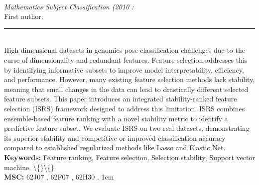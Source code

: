 \documentclass[10pt,twoside]{article}
\begin{document}
\noindent\begin{minipage}[t][\textheight]{\textwidth}
\\[0.35em]
{\itshape Mathematics Subject Classification (2010 :}\\[0.2em]
{\footnotesize First author: }\\[0.45em]
\noindent\rule{\textwidth}{0.3pt}\\[0.4em]
{\footnotesize  High-dimensional datasets in genomics pose classification challenges due to the curse of dimensionality and redundant features. Feature selection addresses this by identifying informative subsets to improve model interpretability, efficiency, and performance. However, many existing feature selection methods lack stability, meaning that small changes in the data can lead to drastically different selected feature subsets. This paper introduces an integrated stability-ranked feature selection (ISRS) framework designed to address this limitation. ISRS combines ensemble-based feature ranking with a novel stability metric to identify a predictive feature subset. We evaluate ISRS on two real datasets, demonstrating its superior stability and competitive or improved classification accuracy compared to established regularized methods like Lasso and Elastic Net.}\\[0.4em]
{\footnotesize\bfseries Keywords:} {\footnotesize Feature ranking, Feature selection, Selection stability, Support vector machine. \textbackslash\{\}\textbackslash\{\}}\\[0.15em]
{\footnotesize\bfseries MSC:} {\footnotesize 62J07 , 62F07 , 62H30 . 1cm}\\
\vfill
\end{minipage}
\newpage
\end{document}
